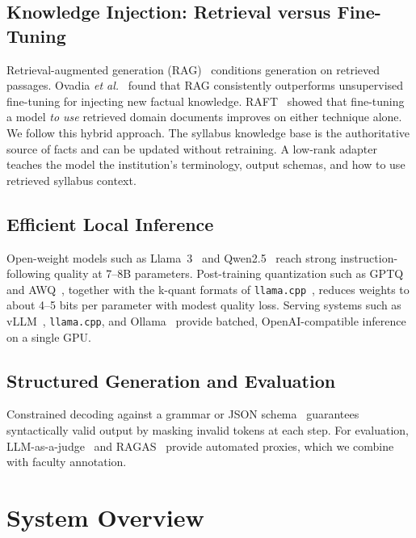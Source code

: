\documentclass[conference]{IEEEtran}
\begin{document}
\subsection{Knowledge Injection: Retrieval versus Fine-Tuning}
Retrieval-augmented generation (RAG)~\cite{lewis2020rag,gao2023ragsurvey}
conditions generation on retrieved passages. Ovadia
\textit{et al.}~\cite{ovadia2024finetuning} found that RAG consistently
outperforms unsupervised fine-tuning for injecting new factual knowledge.
RAFT~\cite{zhang2024raft} showed that fine-tuning a model \emph{to use}
retrieved domain documents improves on either technique alone. We follow this
hybrid approach. The syllabus knowledge base is the authoritative source of
facts and can be updated without retraining. A low-rank
adapter~\cite{hu2022lora,dettmers2023qlora} teaches the model the
institution's terminology, output schemas, and how to use retrieved syllabus
context.

\subsection{Efficient Local Inference}
Open-weight models such as Llama~3~\cite{dubey2024llama3} and
Qwen2.5~\cite{qwen2024qwen25} reach strong instruction-following quality at
7--8B parameters. Post-training quantization such as
GPTQ~\cite{frantar2023gptq} and AWQ~\cite{lin2024awq}, together with
the k-quant formats of \texttt{llama.cpp}~\cite{llamacpp}, reduces weights to
about 4--5 bits per parameter with modest quality loss. Serving systems such
as vLLM~\cite{kwon2023pagedattention}, \texttt{llama.cpp}, and
Ollama~\cite{ollama} provide batched, OpenAI-compatible inference on a single
GPU.

\subsection{Structured Generation and Evaluation}
Constrained decoding against a grammar or JSON schema~\cite{willard2023outlines}
guarantees syntactically valid output by masking invalid tokens at each step.
For evaluation, LLM-as-a-judge~\cite{zheng2023judging} and
RAGAS~\cite{es2024ragas} provide automated proxies, which we combine with
faculty annotation.

\section{System Overview}
\label{sec:system}
\end{document}
